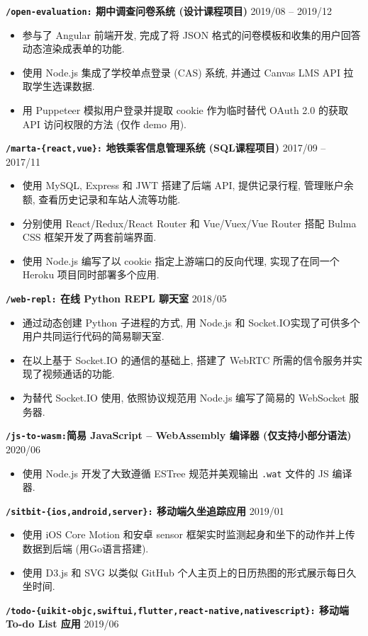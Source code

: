 \documentclass[10 pt]{article}
\begin{document}
\textbf{\texttt{/open-evaluation:} 期中调查问卷系统 (设计课程项目)} \hfill 2019/08 -- 2019/12
\begin{itemize}
\item 参与了 Angular 前端开发, 完成了将 JSON 格式的问卷模板和收集的用户回答动态渲染成表单的功能.
\item 使用 Node.js 集成了学校单点登录 (CAS) 系统, 并通过 Canvas LMS API 拉取学生选课数据.
\item 用 Puppeteer 模拟用户登录并提取 cookie 作为临时替代 OAuth 2.0 的获取 API 访问权限的方法 (仅作 demo 用).
\end{itemize}

\textbf{\texttt{/marta-\{react,vue\}:} 地铁乘客信息管理系统 (SQL课程项目) } \hfill 2017/09 -- 2017/11
\begin{itemize}
\item 使用 MySQL, Express 和 JWT 搭建了后端 API, 提供记录行程, 管理账户余额, 查看历史记录和车站人流等功能.
\item 分别使用 React/Redux/React Router 和 Vue/Vuex/Vue Router 搭配 Bulma  CSS 框架开发了两套前端界面.
\item 使用 Node.js 编写了以 cookie 指定上游端口的反向代理, 实现了在同一个 Heroku 项目同时部署多个应用.
\end{itemize}

\textbf{\texttt{/web-repl:} 在线 Python REPL 聊天室}  \hfill 2018/05 
\begin{itemize}
\item 通过动态创建 Python 子进程的方式, 用 Node.js 和 Socket.IO实现了可供多个用户共同运行代码的简易聊天室.
\item 在以上基于 Socket.IO 的通信的基础上, 搭建了 WebRTC 所需的信令服务并实现了视频通话的功能.
\item 为替代 Socket.IO 使用, 依照协议规范用 Node.js 编写了简易的 WebSocket 服务器.
\end{itemize}

\textbf{\texttt{/js-to-wasm:}简易 JavaScript -- WebAssembly 编译器 (仅支持小部分语法)} \hfill 2020/06
\begin{itemize}
\item 使用 Node.js 开发了大致遵循 ESTree 规范并美观输出 \texttt{.wat} 文件的 JS 编译器.
\end{itemize}

\textbf{\texttt{/sitbit-\{ios,android,server\}:} 移动端久坐追踪应用} \hfill 2019/01
\begin{itemize}
\item 使用 iOS Core Motion 和安卓 sensor 框架实时监测起身和坐下的动作并上传数据到后端 (用Go语言搭建).
\item 使用 D3.js 和 SVG 以类似 GitHub 个人主页上的日历热图的形式展示每日久坐时间.
\end{itemize}

\textbf{\texttt{/todo-\{uikit-objc,swiftui,flutter,react-native,nativescript\}:} 移动端To-do List 应用} \hfill 2019/06
\end{document}
